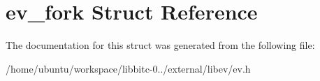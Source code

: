\hypertarget{structev__fork}{\section{ev\-\_\-fork Struct Reference}
\label{structev__fork}
}


The documentation for this struct was generated from the following file\-:\begin{DoxyCompactItemize}
\item 
/home/ubuntu/workspace/libbitc-\/0../external/libev/ev.\-h\end{DoxyCompactItemize}
